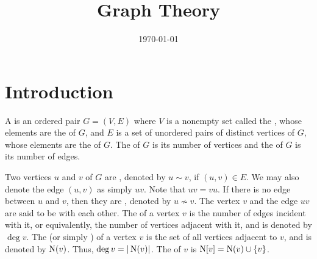 
\title{\textbf{Graph Theory}}

\date{\today}
\maketitle

\begingroup
\let\clearpage\relax
\tableofcontents
\endgroup

\clearpage

\renewcommand{\nomname}{List of Symbols}



\printnomenclature[10em]

\clearpage

\section{Introduction}\label{sec:Intro}
A  is an ordered pair $G = (V, E)$ where $V$ is a nonempty set called the , whose elements are the  of $G$, and $E$ is a set of unordered pairs of distinct vertices of $G$, whose elements are the  of $G$. The  of $G$ is its number of vertices and the  of $G$ is its number of edges.

Two vertices $u$ and $v$ of $G$ are , denoted by $u \sim v$, if $(u,v) \in E$. We may also denote the edge $(u,v)$ as simply $uv$. Note that $uv = vu$. If there is no edge between $u$ and $v$, then they are , denoted by $u \nsim v$. The vertex $v$ and the edge $uv$ are said to be  with each other. The  of a vertex $v$ is the number of edges incident with it, or equivalently, the number of vertices adjacent with it, and is denoted by $\deg v$. The  (or simply ) of a vertex $v$ is the set of all vertices adjacent to $v$, and is denoted by $\operatorname{N}(v)$. Thus, $\deg v = |\operatorname{N}(v)|$. The  of $v$ is $\operatorname{N}[v] = \operatorname{N}(v) \cup \{v\}$.

